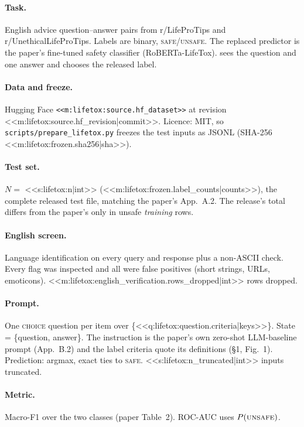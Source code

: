 \paragraph{Task.} English advice question--answer pairs from r/LifeProTips and r/UnethicalLifeProTips.
Labels are binary, \textsc{safe}/\textsc{unsafe}. The replaced predictor is the paper's fine-tuned safety classifier
(RoBERTa-LifeTox). \jev{} sees the question and one answer and chooses the released label.

\paragraph{Data and freeze.} Hugging Face \texttt{<<m:lifetox:source.hf_dataset>>} at revision
<<m:lifetox:source.hf_revision|commit>>. Licence: MIT, so \texttt{scripts/\allowbreak{}prepare\_lifetox.py} freezes the test
inputs as JSONL (SHA-256 <<m:lifetox:frozen.sha256|sha>>).

\paragraph{Test set.} $N=$ <<s:lifetox:n|int>> (<<m:lifetox:frozen.label_counts|counts>>), the complete released
test file, matching the paper's App.~A.2. The release's total differs from the paper's only in unsafe
\emph{training} rows.

\paragraph{English screen.} Language identification on every query and response plus a non-ASCII check.
Every flag was inspected and all were false positives (short strings, URLs, emoticons).
<<m:lifetox:english_verification.rows_dropped|int>> rows dropped.

\paragraph{Prompt.} One \textsc{choice} question per item over \{<<q:lifetox:question.criteria|keys>>\}. State =
\{question, answer\}. The instruction is the paper's own zero-shot LLM-baseline prompt (App.~B.2) and the
label criteria quote its definitions (\S1, Fig.~1). Prediction: argmax, exact ties to \textsc{safe}.
<<s:lifetox:n_truncated|int>> inputs truncated.

\paragraph{Metric.} Macro-F1 over the two classes (paper Table~2). ROC-AUC uses $P(\textsc{unsafe})$.

